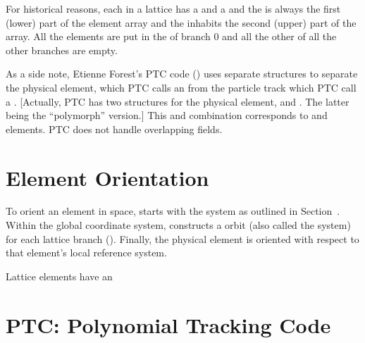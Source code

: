For historical reasons, each  in a lattice has a
 and a  and the  is always the first (lower) part of the element array and the
 inhabits the second (upper) part of the array.  All
the  elements are put in the  of branch 0
and all the other  of all the other branches are
empty.

As a side note, Etienne Forest's PTC code () uses separate
structures to separate the physical element, which PTC calls an
 from the particle track which PTC call a .
[Actually, PTC has two structures for the physical element,
 and . The latter being the ``polymorph''
version.] This  and  combination corresponds to
\bmad {} and  elements. PTC does
not handle overlapping fields.

\section{Element Orientation}
\label{s:ele.orientation}

To orient an element in space, \bmad starts with the  system as outlined in Section~. Within the
global coordinate system, \bmad constructs a  
orbit (also called the   system) for
each lattice branch (). Finally, the
physical element is oriented with respect to that element's local
reference system. 


Lattice elements have an 

\etcetc

\section{PTC: Polynomial Tracking Code}
\label{s:ptc.intro}

